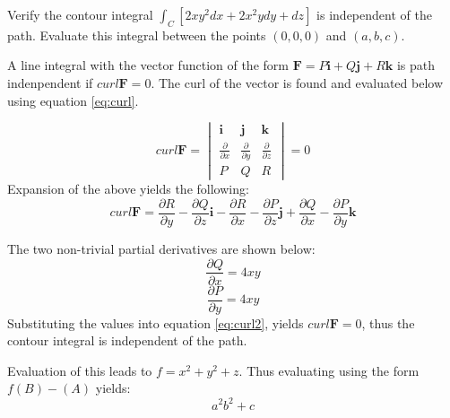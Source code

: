 Verify the contour integral $\int_C \left[2xy^2dx+2x^2ydy+dz\right]$ is independent of the path. Evaluate this integral between the points $\left(0,0,0\right)$ and $\left(a,b,c\right)$.

A line integral with the vector function of the form $\boldsymbol{F}=P\boldsymbol{i}+Q\boldsymbol{j}+R\boldsymbol{k}$ is path indenpendent if $curl \boldsymbol{F}=0$. The curl of the vector is found and evaluated below using equation \ref{eq:curl}.

\begin{equation}
	curl \boldsymbol{F}=
		\begin{vmatrix}
			\boldsymbol{i} &\boldsymbol{j} & \boldsymbol{k} \\
			\frac{\partial}{\partial x} & \frac{\partial}{\partial y} &\frac{\partial}{\partial z}\\
			P & Q & R 
		\end{vmatrix}
		=0
	\label{eq:curl}
\end{equation}
 Expansion of the above yields the following:
\begin{equation}
	curl \boldsymbol{F}= \frac{\partial R}{\partial y}-\frac{\partial Q}{\partial z}\boldsymbol{i} -
							\frac{\partial R}{\partial x}-\frac{\partial P}{\partial z}\boldsymbol{j}+
							\frac{\partial Q}{\partial x}-\frac{\partial P}{\partial y}\boldsymbol{k}
	\label{eq:curl2}
\end{equation}

The two non-trivial partial derivatives are shown below:
\begin{equation*}
	\frac{\partial Q}{\partial x}=4xy
\end{equation*}
\begin{equation*}
	\frac{\partial P}{\partial y}=4xy
\end{equation*}
Substituting the values into equation \ref{eq:curl2}, yields $curl \boldsymbol{F}=0$, thus the contour integral is independent of the path.

Evaluation of this leads to $f=x^2+y^2+z$. Thus evaluating using the form $f\left(B\right)-\left(A\right)$ yields:
\begin{equation*}
\boxed{
	a^2b^2+c}
	\end{equation*}


